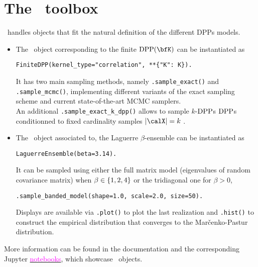 \section{The \DPPy\ toolbox} %
\label{sec:the_dppy_toolbox}
  
  \lstset{language=mypython}

  \DPPy\ handles objects that fit the natural definition of the different DPPs models.
  \begin{itemize}
	  \item The \DPPy\ object corresponding to the finite $\DPP(\bfK)$ can be instantiated as
      \begin{lstlisting}[aboveskip=5pt,
                      belowskip=-1pt,
                      xleftmargin=.1\textwidth,
                      xrightmargin=.2\textwidth]
        FiniteDPP(kernel_type="correlation", **{"K": K}).
      \end{lstlisting}
    It has two main sampling methods, namely 
    \lstinline{.sample_exact()} and 
    \lstinline{.sample_mcmc()}, 
    implementing different variants of the exact sampling scheme and current state-of-the-art MCMC samplers.\\
    An additional
    \lstinline{.sample_exact_k_dpp()}
    allows to sample $k$-$\operatorname{DPP}$s \ie $\operatorname{DPP}$s conditionned to fixed cardinality samples $|\calX|=k$ \citep[Section 5]{KuTa12}.

		\item The \DPPy\ object associated to, \eg the Laguerre $\beta$-ensemble can be instantiated as
    \begin{lstlisting}[aboveskip=5pt,
                      belowskip=-1pt,
                      xleftmargin=.2\textwidth,
                      xrightmargin=.2\textwidth]
      LaguerreEnsemble(beta=3.14).
    \end{lstlisting}
    It can be sampled using either the full matrix model (eigenvalues of random covariance matrix) when $\beta\in\left\{ 1,2,4 \right\}$ or the tridiagonal one for $\beta > 0$,
      \begin{lstlisting}[aboveskip=5pt,
                      belowskip=-1pt,
                      xleftmargin=.1\textwidth,
                      xrightmargin=.2\textwidth]
      .sample_banded_model(shape=1.0, scale=2.0, size=50).
      \end{lstlisting}
    Displays are available via 
    \lstinline{.plot()} to plot the last realization and 
    \lstinline{.hist()} to construct the empirical distribution that converges to the Mar\v{c}enko-Pastur distribution.
  \end{itemize}
  More information can be found in the documentation and the corresponding Jupyter \href{https://github.com/guilgautier/DPPy/tree/master/notebooks}{\textcolor{magenta}{notebooks}}, which showcase \DPPy\ objects.

